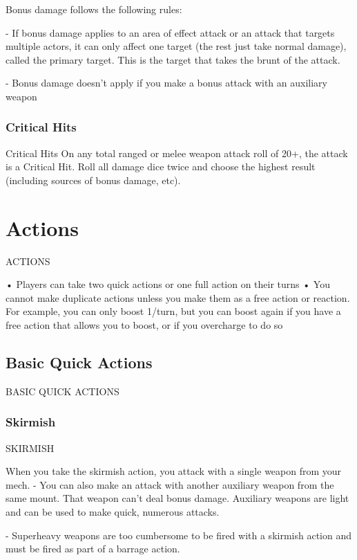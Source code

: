 Bonus damage follows the following rules:

         	- If bonus damage applies to an area of effect attack or an attack that targets multiple
         actors, it can only affect one target (the rest just take normal damage), called the primary
         target. This is the target that takes the brunt of the attack.

         	- Bonus damage doesn’t apply if you make a bonus attack with an auxiliary weapon

\subsection{Critical Hits}
                                                Critical Hits
On any total ranged or melee weapon attack roll of 20+, the attack is a Critical Hit. Roll all
damage dice twice and choose the highest result (including sources of bonus damage, etc).

\chapter{Actions}
 ACTIONS

•   Players can take two quick actions or one full action on their turns
•   You cannot make duplicate actions unless you make them as a free action or reaction. For
    example, you can only boost 1/turn, but you can boost again if you have a free action that
    allows you to boost, or if you overcharge to do so

\section{Basic Quick Actions}

                       BASIC QUICK ACTIONS
\subsection{Skirmish}

                                             SKIRMISH

When you take the skirmish action, you attack with a single weapon from your mech.
        - You can also make an attack with another auxiliary weapon from the same mount. That
        weapon can’t deal bonus damage. Auxiliary weapons are light and can be used to make
        quick, numerous attacks.

        	- Superheavy weapons are too cumbersome to be fired with a skirmish action and must
        be fired as part of a barrage action.

